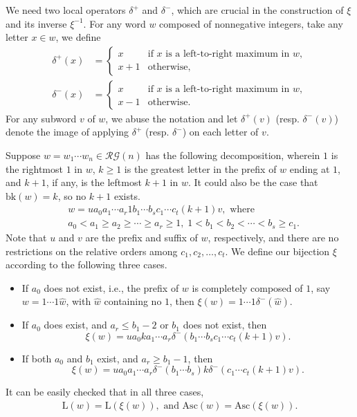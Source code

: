 \documentclass[12pt]{amsart}
\numberwithin{equation}{section}
\theoremstyle{plain}
\theoremstyle{definition}
\def\bk{\mathrm{bk}}
\def\Asc{\mathrm{Asc}}
\def\LL{\mathrm{L}}
\def\RG{\mathcal{RG}}
\begin{document}
We need two local operators $\delta^+$ and $\delta^-$, which are crucial in the construction of $\xi$ and its inverse $\xi^{-1}$. For any word $w$ composed of nonnegative integers, take any letter $x\in w$, we define
\begin{align*}
\delta^+(x) &=\begin{cases}
x & \text{if $x$ is a left-to-right maximum in $w$},\\
x+1 & \text{otherwise},
\end{cases}
\\
\delta^-(x) &=\begin{cases}
x & \text{if $x$ is a left-to-right maximum in $w$},\\
x-1 & \text{otherwise}.
\end{cases}
\end{align*}
For any subword $v$ of $w$, we abuse the notation and let $\delta^+(v)$ (resp. $\delta^-(v)$) denote the image of applying $\delta^+$ (resp. $\delta^-$) on each letter of $v$.

Suppose $w=w_1\cdots w_n\in \RG(n)$ has the following decomposition, wherein $1$ is the rightmost $1$ in $w$, $k\ge 1$ is the greatest letter in the prefix of $w$ ending at $1$, and $k+1$, if any, is the leftmost $k+1$ in $w$. It could also be the case that $\bk(w)=k$, so no $k+1$ exists.
\begin{align*}
& w=u a_0a_1\cdots a_r 1 b_1\cdots b_s c_1\cdots c_t (k+1)v, \text{ where}\\
& a_0<a_1\ge a_2\ge \cdots \ge a_r\ge 1, \; 1<b_1<b_2<\cdots<b_s\ge c_1.
\end{align*}
Note that $u$ and $v$ are the prefix and suffix of $w$, respectively, and there are no restrictions on the relative orders among $c_1, c_2,\ldots, c_t$. We define our bijection $\xi$ according to the following three cases.
\begin{itemize}
	\item[I.] If $a_0$ does not exist, i.e., the prefix of $w$ is completely composed of $1$, say $w=1\cdots 1\hat{w}$, with $\hat{w}$ containing no $1$, then $\xi(w)=1\cdots 1\delta^-(\hat{w})$.
	\item[II.] If $a_0$ does exist, and $a_r\le b_1-2$ or $b_1$ does not exist, then $$\xi(w)=ua_0ka_1\cdots a_r\delta^-(b_1\cdots b_s c_1\cdots c_t(k+1)v).$$
	\item[III.] If both $a_0$ and $b_1$ exist, and $a_r\ge b_1-1$, then $$\xi(w)=ua_0a_1\cdots a_r\delta^-(b_1\cdots b_s)k\delta^-(c_1 \cdots c_t(k+1)v).$$
\end{itemize}
It can be easily checked that in all three cases,
\begin{align}\label{L-Asc}
\LL(w) = \LL(\xi(w)),\text{ and } \Asc(w) = \Asc(\xi(w)).
\end{align}
\end{document}
